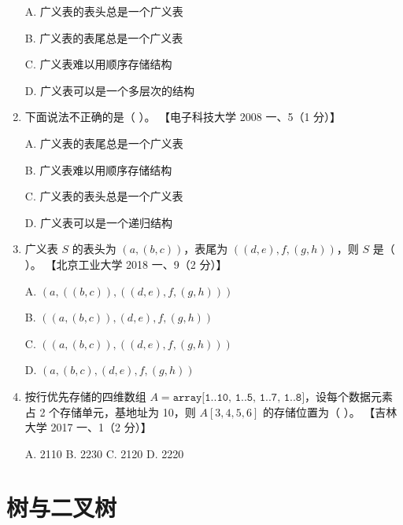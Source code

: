 \documentclass[lang=cn,newtx,10pt,scheme=chinese]{elegantbook}
\begin{document}
\begin{enumerate}
    A. 广义表的表头总是一个广义表  

    B. 广义表的表尾总是一个广义表  


    C. 广义表难以用顺序存储结构  

    D. 广义表可以是一个多层次的结构  

    \item 下面说法不正确的是（ ）。  
    【电子科技大学 2008 一、5（1 分）】  

    A. 广义表的表尾总是一个广义表  

    B. 广义表难以用顺序存储结构  

    C. 广义表的表头总是一个广义表  

    D. 广义表可以是一个递归结构  

    \item 广义表 $S$ 的表头为 $(a, (b, c))$，表尾为 $((d, e), f,(g, h))$，则 $S$ 是（ ）。  
    【北京工业大学 2018 一、9（2 分）】  

    A. $(a, ((b, c)), ((d, e),f, (g, h)))$  

    B. $((a, (b, c)), (d, e), f, (g, h))$  

    C. $((a, (b, c)), ((d, e), f, (g, h)))$  

    D. $(a, (b, c), (d, e), f, (g, h))$  

    \item 按行优先存储的四维数组 $A = \texttt{array[1..10, 1..5, 1..7, 1..8]}$，设每个数据元素占 2 个存储单元，基地址为 10，则 $A[3, 4, 5, 6]$ 的存储位置为（ ）。  
    【吉林大学 2017 一、1（2 分）】  

    A. 2110 \quad B. 2230 \quad C. 2120 \quad D. 2220 
\end{enumerate}

\chapter{树与二叉树}
\end{document}
